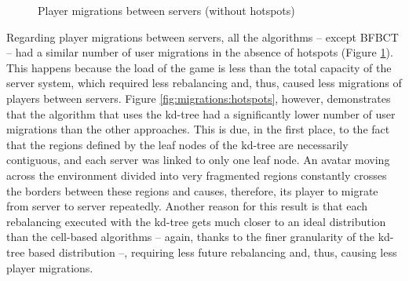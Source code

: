 \documentclass[acmjacm]{acmtrans2m}
\begin{document}
\begin{figure}[!t]
	\caption{Player migrations between servers (without hotspots)}
	\label{fig:migrations:uniform}
\end{figure}


Regarding player migrations between servers, all the algorithms -- except BFBCT -- had a similar number of user migrations in the absence of hotspots (Figure \ref{fig:migrations:uniform}). This happens because the load of the game is less than the total capacity of the server system, which required less rebalancing and, thus, caused less migrations of players between servers. Figure \ref{fig:migrations:hotspots}, however, demonstrates that the algorithm that uses the kd-tree had a significantly lower number of user migrations than the other approaches. This is due, in the first place, to the fact that the regions defined by the leaf nodes of the kd-tree are necessarily contiguous, and each server was linked to only one leaf node. An avatar moving across the environment divided into very fragmented regions constantly crosses the borders between these regions and causes, therefore, its player to migrate from server to server repeatedly. Another reason for this result is that each rebalancing executed with the kd-tree gets much closer to an ideal distribution than the cell-based algorithms -- again, thanks to the finer granularity of the kd-tree based distribution --, requiring less future rebalancing and, thus, causing less player migrations.
\end{document}
